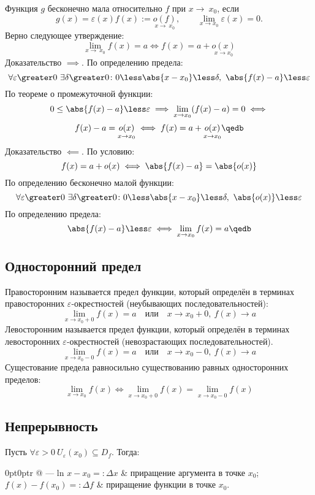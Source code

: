 Функция $g$ {\ital бесконечно мала} относительно $f$ при $x\to\ x_0$, если
$$g(x)=\varepsilon(x)f(x):=\underset{x\to\ x_0}{o(f)},\quad\quad\lim_{x\to x_0}\varepsilon
(x)=0.$$
Верно следующее утверждение:
$$\lim_{x\to\ x_0}f(x)=a\iff f(x)=a+\underset{x\to x_0}{o(x)}$$
{\bold Доказательство $\implies$.} По определению предела:
$$\forall\varepsilon\greater 0\ \exists\delta\greater 0\colon 0\less\abs{x-x_0}\less
\delta,\ \abs{f(x)-a}\less\varepsilon$$
По теореме о промежуточной функции:
$$0\leq\abs{f(x)-a}\less\varepsilon\implies\lim_{x\to x_0}(f(x)-a)=0\iff$$
$$f(x)-a=\underset{x\to x_0}{o(x)}\iff f(x)=a+\underset{x\to x_0}{o(x)}\qedb$$
{\bold Доказательство $\impliedby$.} По условию:
$$f(x)=a+o(x)\iff\abs{f(x)-a}=\abs{o(x)}$$
По определению бесконечно малой функции:
$$\forall\varepsilon\greater 0\ \exists\delta\greater 0\colon 0\less\abs{x-x_0}\less
\delta,\ \abs{o(x)}\less\varepsilon$$
По определению предела:
$$\abs{f(x)-a}\less\varepsilon\iff\lim_{x\to x_0}f(x)=a\qedb$$

\subsection{Односторонний предел}

{\bold Правосторонним} называется предел функции, который определён в терминах
правосторонних $\varepsilon$-окрестностей {\ital (неубывающих 
последовательностей)}:
$$\lim_{x\to x_0+0}f(x)=a\quad\text{или}\quad x\to x_0+0,\ f(x)\to a$$
{\bold Левосторонним} называется предел функции, который определён в терминах
левосторонних $\varepsilon$-окрестностей {\ital (невозрастающих 
последовательностей)}.
$$\lim_{x\to x_0-0}f(x)=a\quad\text{или}\quad x\to x_0-0,\ f(x)\to a$$
Сущестование предела равносильно существованию {\ital равных} односторонних пределов:
$$\lim_{x\to x_0}f(x)\iff\lim_{x\to x_0+0}f(x)=\lim_{x\to x_0-0}f(x)$$

\subsection{Непрерывность}

Пусть $\forall\varepsilon\greater 0\ U_\varepsilon(x_0)\subseteq D_f$. Тогда:

\begin{tabularc}{0pt}{0pt}{r @{ --- } l}{n}
$x-x_0=:\Delta x$ & {\ital приращение аргумента} в точке $x_0$;\\
$f(x)-f(x_0)=:\Delta f$ & {\ital приращение функции} в точке $x_0$.
\end{tabularc}

